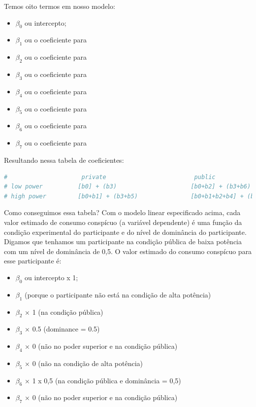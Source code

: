 \documentclass{article}
\begin{document}
Temos oito termos em nosso modelo:
\begin{itemize}
    \item $\beta_0$ ou intercepto;
    \item $\beta_1$ ou o coeficiente para 
    \item $\beta_2$ ou o coeficiente para 
      \item $\beta_3$ ou o coeficiente para 
        \item $\beta_4$ ou o coeficiente para 
          \item $\beta_5$ ou o coeficiente para 
            \item $\beta_6$ ou o coeficiente para 
              \item $\beta_7$ ou o coeficiente para 
\end{itemize}

Resultando nessa tabela de coeficientes:

\begin{lstlisting}[language=R]
#                     private                         public
# low power          [b0] + (b3)                     [b0+b2] + (b3+b6)
# high power         [b0+b1] + (b3+b5)               [b0+b1+b2+b4] + (b3+b5+b6+b7)
\end{lstlisting}

Como conseguimos essa tabela? Com o modelo linear especificado acima, cada valor estimado de consumo conspícuo (a variável dependente) é uma função da condição experimental do participante e do nível de dominância do participante. Digamos que tenhamos um participante na condição pública de baixa potência com um nível de dominância de 0,5. O valor estimado do consumo conspícuo para esse participante é:


\begin{itemize}
    \item $\beta_0$ ou intercepto x 1;
    \item $\beta_1$  (porque o participante não está na condição de alta potência)
    \item $\beta_2$  × 1 (na condição pública)
      \item $\beta_3$  ×  0.5 (dominance = 0.5)
        \item $\beta_4$  × 0 (não no poder superior e na condição pública)
          \item $\beta_5$  × 0 (não na condição de alta potência)
            \item $\beta_6$  × 1 x 0,5 (na condição pública e dominância = 0,5)
              \item $\beta_7$  × 0 (não no poder superior e na condição pública)
\end{itemize}
\end{document}
